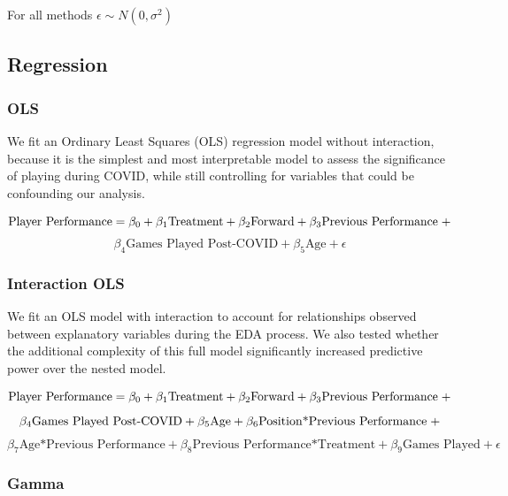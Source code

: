 \documentclass[12pt]{article}
\begin{document}
For all methods \(\epsilon \sim N(0, \sigma^2)\)

\hypertarget{regression}{%
\subsection{Regression}\label{regression}}

\hypertarget{ols}{%
\subsubsection{OLS}\label{ols}}

We fit an Ordinary Least Squares (OLS) regression model without
interaction, because it is the simplest and most interpretable model to
assess the significance of playing during COVID, while still controlling
for variables that could be confounding our analysis.

\vspace{-.5cm}

\[\text{Player Performance} = \beta_0 + \beta_1\text{Treatment} + \beta_2\text{Forward} +  \beta_3\text{Previous Performance} \hspace{.1cm} + \]
\[\beta_4\text{Games Played Post-COVID} + \beta_5\text{Age} + \epsilon\]

\hypertarget{interaction-ols}{%
\subsubsection{Interaction OLS}\label{interaction-ols}}

We fit an OLS model with interaction to account for relationships
observed between explanatory variables during the EDA process. We also
tested whether the additional complexity of this full model
significantly increased predictive power over the nested model.

\vspace{-.5cm}

\[\text{Player Performance} = \beta_{0} + \beta_{1}\text{Treatment} + \beta_{2}\text{Forward} +  \beta_{3}\text{Previous Performance} \hspace{.1cm} +\]
\[\beta_{4}\text{Games Played Post-COVID} + \beta_{5}\text{Age} + \beta_{6}\text{Position*Previous Performance} \hspace{.1cm} + \]
\[\beta_{7}\text{Age*Previous Performance} + \beta_{8}\text{Previous Performance*Treatment} + \beta_{9}\text{Games Played} + \epsilon\]

\hypertarget{gamma}{%
\subsubsection{Gamma}\label{gamma}}
\end{document}
